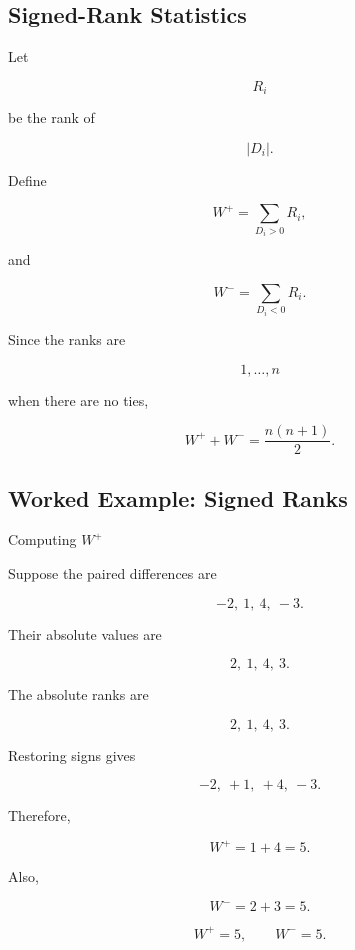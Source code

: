 \subsection{Signed-Rank Statistics}
\label{subsec:signed-rank-statistics}

Let

\[
R_i
\]

be the rank of

\[
|D_i|.
\]

Define

\[
\boxed{
W^+
=
\sum_{D_i>0}R_i,
}
\]

and

\[
\boxed{
W^-
=
\sum_{D_i<0}R_i.
}
\]

Since the ranks are

\[
1,\ldots,n
\]

when there are no ties,

\[
\boxed{
W^++W^-
=
\frac{
n(n+1)
}{2}.
}
\]

\subsection{Worked Example: Signed Ranks}
\label{subsec:worked-signed-ranks}

\begin{workedexamplebox}{Computing \(W^+\)}

Suppose the paired differences are

\[
-2,\ 1,\ 4,\ -3.
\]

Their absolute values are

\[
2,\ 1,\ 4,\ 3.
\]

The absolute ranks are

\[
2,\ 1,\ 4,\ 3.
\]

Restoring signs gives

\[
-2,\ +1,\ +4,\ -3.
\]

Therefore,

\[
W^+
=
1+4
=
5.
\]

Also,

\[
W^-
=
2+3
=
5.
\]

\begin{answerbox}
\[
\boxed{
W^+=5,
\qquad
W^-=5.
}
\]
\end{answerbox}

\end{workedexamplebox}


